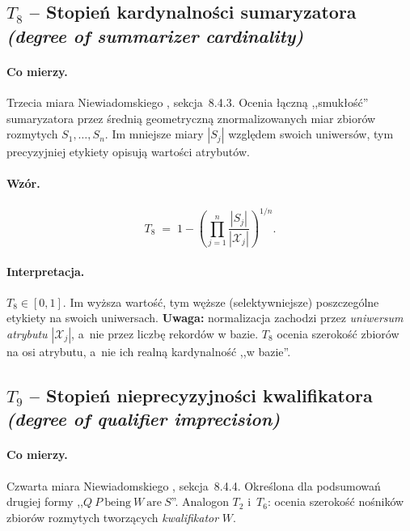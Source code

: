 \subsection*{$T_8$ -- Stopień kardynalności sumaryzatora \\
\textit{(degree of summarizer cardinality)}}

\paragraph{Co mierzy.}
Trzecia miara Niewiadomskiego \cite{niewiadomski2008}, sekcja~8.4.3.
Ocenia łączną ,,smukłość'' sumaryzatora przez średnią geometryczną
znormalizowanych miar zbiorów rozmytych $S_1, \ldots, S_n$. Im mniejsze
miary $|S_j|$ względem swoich uniwersów, tym precyzyjniej etykiety
opisują wartości atrybutów.

\paragraph{Wzór.}
\begin{equation}
\label{eq:T8}
    T_8 \;=\; 1 - \left( \prod_{j=1}^{n} \frac{|S_j|}{|\mathcal{X}_j|} \right)^{1/n}.
\end{equation}

\paragraph{Interpretacja.}
$T_8 \in [0, 1]$. Im wyższa wartość, tym węższe (selektywniejsze)
poszczególne etykiety na swoich uniwersach. \textbf{Uwaga:}
normalizacja zachodzi przez \emph{uniwersum atrybutu}
$|\mathcal{X}_j|$, a~nie przez liczbę rekordów w bazie. $T_8$ ocenia
szerokość zbiorów na osi atrybutu, a~nie ich realną kardynalność
,,w bazie''.

\subsection*{$T_9$ -- Stopień nieprecyzyjności kwalifikatora \\
\textit{(degree of qualifier imprecision)}}

\paragraph{Co mierzy.}
Czwarta miara Niewiadomskiego \cite{niewiadomski2008}, sekcja~8.4.4.
Określona dla podsumowań drugiej formy ,,$Q\ P\ \text{being}\ W\
\text{are}\ S$''. Analogon $T_2$ i~$T_6$: ocenia szerokość nośników
zbiorów rozmytych tworzących \emph{kwalifikator} $W$.


